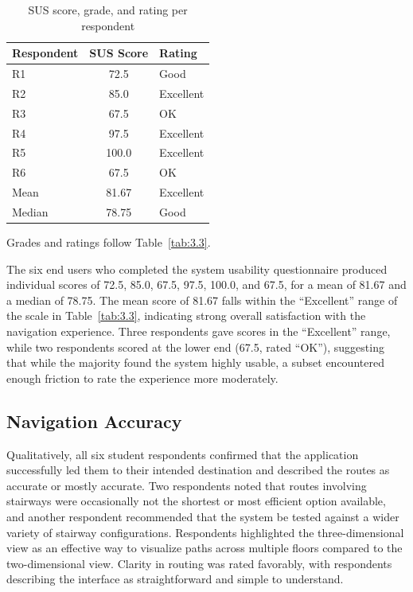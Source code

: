 \begin{table}[htbp]
\centering
\singlespacing
\caption{SUS score, grade, and rating per respondent}\label{tab:4.2}
\renewcommand{\arraystretch}{1.15}
\begin{tabular}{lcl}
\toprule
\textbf{Respondent} & \textbf{SUS Score} & \textbf{Rating} \\
\midrule
R1 & 72.5 & Good \\
R2 & 85.0 & Excellent \\
R3 & 67.5 & OK \\
R4 & 97.5 & Excellent \\
R5 & 100.0 & Excellent \\
R6 & 67.5 & OK \\
Mean & 81.67 & Excellent \\
Median & 78.75 & Good \\
\bottomrule
\end{tabular}
\par\vspace{4pt}
{\footnotesize\raggedright\setlength{\parindent}{0pt}Grades and ratings follow Table~\ref{tab:3.3}.\par}
\end{table}

The six end users who completed the system usability questionnaire produced
individual scores of 72.5, 85.0, 67.5, 97.5, 100.0, and 67.5, for a mean of
81.67 and a median of 78.75. The mean score of 81.67 falls within the
``Excellent'' range of the scale in Table~\ref{tab:3.3}, indicating strong
overall satisfaction with the navigation experience. Three respondents gave
scores in the ``Excellent'' range, while two respondents scored at the lower end
(67.5, rated ``OK''), suggesting that while the majority found the system highly
usable, a subset encountered enough friction to rate the experience more
moderately.

\subsection{Navigation Accuracy}\label{sec:4.7.2}

Qualitatively, all six student respondents confirmed that the application
successfully led them to their intended destination and described the routes as
accurate or mostly accurate. Two respondents noted that routes involving
stairways were occasionally not the shortest or most efficient option available,
and another respondent recommended that the system be tested against a wider
variety of stairway configurations. Respondents highlighted the
three-dimensional view as an effective way to visualize paths across multiple
floors compared to the two-dimensional view. Clarity in routing was rated
favorably, with respondents describing the interface as straightforward and
simple to understand.

